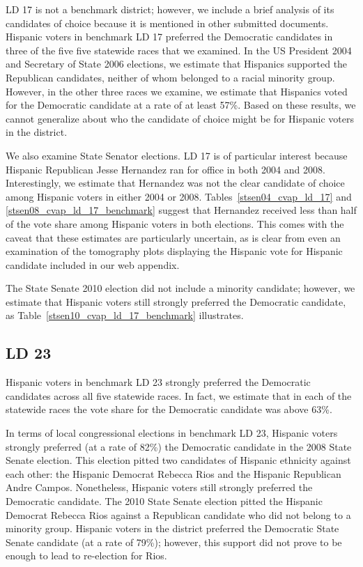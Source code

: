 \documentclass[12pt]{article}
\begin{document}
LD 17 is not a benchmark district; however, we include a brief
analysis of its candidates of choice because it is mentioned in other
submitted documents.  Hispanic voters in benchmark LD 17 preferred the
Democratic candidates in three of the five five statewide races that
we examined. In the US President 2004 and Secretary of State 2006
elections, we estimate that Hispanics supported the Republican
candidates, neither of whom belonged to a racial minority group.
However, in the other three races we examine, we estimate that
Hispanics voted for the Democratic candidate at a rate of at least
57\%. Based on these results, we cannot generalize about who the
candidate of choice might be for Hispanic voters in the district.

We also examine State Senator elections. LD 17 is of particular
interest because Hispanic Republican Jesse Hernandez ran for office in
both 2004 and 2008. Interestingly, we estimate that Hernandez was not
the clear candidate of choice among Hispanic voters in either 2004 or
2008. Tables~\ref{stsen04_cvap_ld_17} and
\ref{stsen08_cvap_ld_17_benchmark} suggest that Hernandez received
less than half of the vote share among Hispanic voters in both
elections.  This comes with the caveat that these estimates are
particularly uncertain, as is clear from even an examination of the
tomography plots displaying the Hispanic vote for Hispanic candidate
included in our web appendix.

The State Senate 2010 election did not include a minority candidate;
however, we estimate that Hispanic voters still strongly preferred the
Democratic candidate, as Table~\ref{stsen10_cvap_ld_17_benchmark}
illustrates.

\subsection{LD 23}

Hispanic voters in benchmark LD 23 strongly preferred the Democratic
candidates across all five statewide races. In fact, we estimate that
in each of the statewide races the vote share for the Democratic
candidate was above 63\%.

In terms of local congressional elections in benchmark LD 23, Hispanic
voters strongly preferred (at a rate of 82\%) the Democratic candidate
in the 2008 State Senate election. This election pitted two candidates
of Hispanic ethnicity against each other: the Hispanic Democrat
Rebecca Rios and the Hispanic Republican Andre Campos. Nonetheless,
Hispanic voters still strongly preferred the Democratic candidate.
The 2010 State Senate election pitted the Hispanic Democrat Rebecca
Rios against a Republican candidate who did not belong to a minority
group. Hispanic voters in the district preferred the Democratic State
Senate candidate (at a rate of 79\%); however, this support did not
prove to be enough to lead to re-election for Rios.
\end{document}
